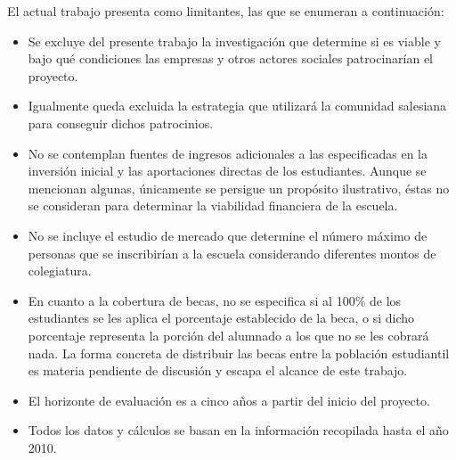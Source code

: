 El actual trabajo presenta como limitantes, las que se enumeran a continuación:

\begin{itemize}
	\item Se excluye del presente trabajo la investigación que determine si es viable y bajo qué condiciones las empresas y otros actores sociales patrocinarían el proyecto.
	\item Igualmente queda excluida la estrategia que utilizará la comunidad salesiana para conseguir dichos patrocinios.
	\item No se contemplan fuentes de ingresos adicionales a las especificadas en la inversión inicial y las aportaciones directas de los estudiantes. Aunque se mencionan algunas, únicamente se persigue un propósito ilustrativo, éstas no se consideran para determinar la viabilidad financiera de la escuela.
	\item No se incluye el estudio de mercado que determine el número máximo de personas que se inscribirían a la escuela considerando diferentes montos de colegiatura. %
	\item En cuanto a la cobertura de becas, no se especifica si al 100\% de los estudiantes se les aplica el porcentaje establecido de la beca, o si dicho porcentaje representa la porción del alumnado a los que no se les cobrará nada. La forma concreta de distribuir las becas entre la población estudiantil es materia pendiente de discusión y escapa el alcance de este trabajo.
	\item El horizonte de evaluación es a cinco años a partir del inicio del proyecto. %
	\item Todos los datos y cálculos se basan en la información recopilada hasta el año 2010. %
\end{itemize}




